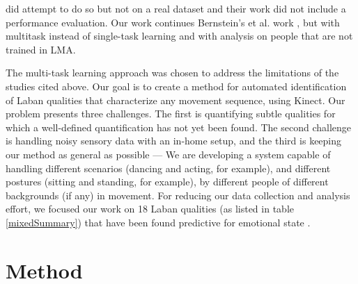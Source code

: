 \documentclass{sigchi}
\begin{document}
\cite{kim} did attempt to do so but not on a real dataset and their work did not include a performance evaluation. Our work continues Bernstein's et al. work \cite{ran}, but with multitask instead of single-task learning and with analysis on people that are not trained in LMA.
\mbox{}\\
\par
The multi-task learning approach was chosen to address the limitations of the studies cited above. Our goal is to create a method for automated identification of Laban qualities that
characterize any movement sequence, using Kinect.
Our problem presents three challenges. The first is
quantifying subtle qualities for which a well-defined quantification has not yet been found.
The second challenge is handling noisy sensory data with an in-home setup, and the
third is keeping our method as general as possible --- We are developing a system capable of
handling different scenarios (dancing and acting, for example), and different postures (sitting and standing, for example), by different people of different backgrounds (if any)
in movement. For reducing our data collection and analysis effort, we focused our work on 18 Laban qualities
(as listed in table \ref{mixedSummary}) that have been found predictive for emotional state \cite{Tsachor}.

\section{Method}
\end{document}
